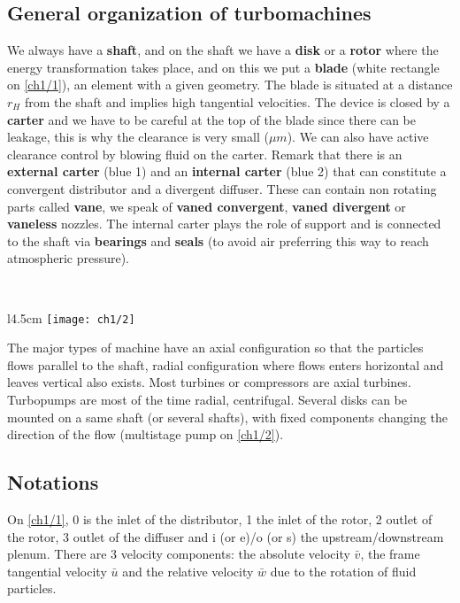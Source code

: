 \subsection{General organization of turbomachines}
We always have a \textbf{shaft}, and on the shaft we have a \textbf{disk} or a \textbf{rotor} where the energy transformation takes place, and on this we put a \textbf{blade} (white rectangle on \autoref{ch1/1}), an element with a given geometry. The blade is situated at a distance $r_H$ from the shaft and implies high tangential velocities. The device is closed by a \textbf{carter} and we have to be careful at the top of the blade since there can be leakage, this is why the clearance is very small ($\mu m$). We can also have active clearance control by blowing fluid on the carter. Remark that there is an \textbf{external carter} (blue 1) and an \textbf{internal carter} (blue 2) that can constitute a convergent distributor and a divergent diffuser. These can contain non rotating parts called \textbf{vane}, we speak of \textbf{vaned convergent}, \textbf{vaned divergent} or \textbf{vaneless} nozzles. The internal carter plays the role of support and is connected to the shaft via \textbf{bearings} and \textbf{seals} (to avoid air preferring this way to reach atmospheric pressure). 

\ \\
\begin{wrapfigure}[7]{l}{4.5cm}
\vspace{-10mm}
\texttt{[image: ch1/2]}
\label{ch1/2}
\end{wrapfigure}
The major types of machine have an axial configuration so that the particles flows parallel to the shaft, radial configuration where flows enters horizontal and leaves vertical also exists. Most turbines or compressors are axial turbines. Turbopumps are most of the time radial, centrifugal. Several disks can be mounted on a same shaft (or several shafts), with fixed components changing the direction of the flow (multistage pump on \autoref{ch1/2}).

\subsection{Notations}
On \autoref{ch1/1}, 0 is the inlet of the distributor, 1 the inlet of the rotor, 2 outlet of the rotor, 3 outlet of the diffuser and i (or e)/o (or s) the upstream/downstream plenum. There are 3 velocity components: the absolute velocity $\bar{v}$, the frame tangential velocity $\bar{u}$ and the relative velocity $\bar{w}$ due to the rotation of fluid particles. 

